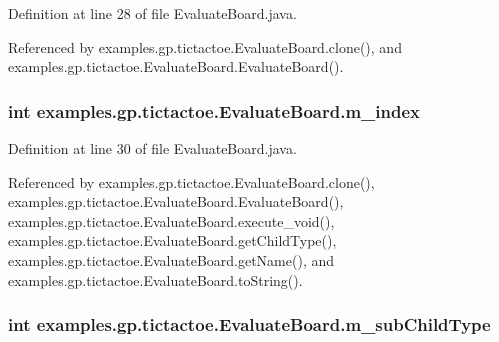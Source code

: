 Definition at line 28 of file Evaluate\-Board.\-java.



Referenced by examples.\-gp.\-tictactoe.\-Evaluate\-Board.\-clone(), and examples.\-gp.\-tictactoe.\-Evaluate\-Board.\-Evaluate\-Board().

\hypertarget{classexamples_1_1gp_1_1tictactoe_1_1_evaluate_board_aeca29a755ed186329ba08b030f43eda1}{
\subsubsection[{m\-\_\-index}]{\setlength{\rightskip}{0pt plus 5cm}int examples.\-gp.\-tictactoe.\-Evaluate\-Board.\-m\-\_\-index\hspace{0.3cm}{\ttfamily [private]}}}\label{classexamples_1_1gp_1_1tictactoe_1_1_evaluate_board_aeca29a755ed186329ba08b030f43eda1}


Definition at line 30 of file Evaluate\-Board.\-java.



Referenced by examples.\-gp.\-tictactoe.\-Evaluate\-Board.\-clone(), examples.\-gp.\-tictactoe.\-Evaluate\-Board.\-Evaluate\-Board(), examples.\-gp.\-tictactoe.\-Evaluate\-Board.\-execute\-\_\-void(), examples.\-gp.\-tictactoe.\-Evaluate\-Board.\-get\-Child\-Type(), examples.\-gp.\-tictactoe.\-Evaluate\-Board.\-get\-Name(), and examples.\-gp.\-tictactoe.\-Evaluate\-Board.\-to\-String().

\hypertarget{classexamples_1_1gp_1_1tictactoe_1_1_evaluate_board_a48960165a492727c790197ffff4c4ead}{
\subsubsection[{m\-\_\-sub\-Child\-Type}]{\setlength{\rightskip}{0pt plus 5cm}int examples.\-gp.\-tictactoe.\-Evaluate\-Board.\-m\-\_\-sub\-Child\-Type\hspace{0.3cm}{\ttfamily [private]}}}\label{classexamples_1_1gp_1_1tictactoe_1_1_evaluate_board_a48960165a492727c790197ffff4c4ead}


